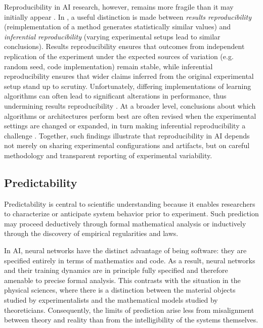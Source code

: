 \documentclass{article}
\begin{document}
Reproducibility in AI research, however, remains more fragile than it may initially appear \cite{pmlr-v97-bouthillier19a, henderson2018deep}.
In \cite{pmlr-v97-bouthillier19a}, a useful distinction is made between \textit{results reproducibility} (reimplementation of a method generates statistically similar values) and \textit{inferential reproducibility} (varying experimental setups lead to similar conclusions).
Results reproducibility ensures that outcomes from independent replication of the experiment under the expected sources of variation (e.g. random seed, code implementation) remain stable, while inferential reproducibility ensures that wider claims inferred from the original experimental setup stand up to scrutiny.
Unfortunately, differing implementations of learning algorithms can often lead to significant alterations in performance, thus undermining results reproducibility \cite{henderson2018deep}.
At a broader level, conclusions about which algorithms or architectures perform best are often revised when the experimental settings are changed or expanded, in turn making inferential reproducibility a challenge \cite{lucic2017_are_gans_created_equal, pmlr-v97-bouthillier19a, li2019random}.
Together, such findings illustrate that reproducibility in AI depends not merely on sharing experimental configurations and artifacts, but on careful methodology and transparent reporting of experimental variability.



\subsection{Predictability}

Predictability is central to scientific understanding because it enables researchers to characterize or anticipate system behavior prior to experiment.
Such prediction may proceed deductively through formal mathematical analysis or inductively through the discovery of empirical regularities and laws.

In AI, neural networks have the distinct advantage of being software: they are specified entirely in terms of mathematics and code.
As a result, neural networks and their training dynamics are in principle fully specified and therefore amenable to precise formal analysis.
This contrasts with the situation in the physical sciences, where there is a distinction between the material objects studied by experimentalists and the mathematical models studied by theoreticians.
Consequently, the limits of prediction arise less from misalignment between theory and reality than from the intelligibility of the systems themselves.
\end{document}
